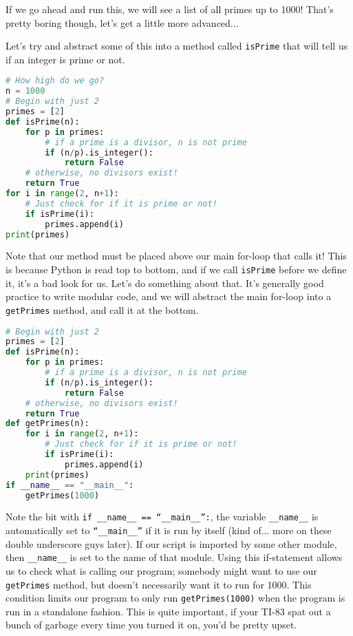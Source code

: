 \documentclass[12pt, twoside, reqno]{book}
\begin{document}
If we go ahead and run this, we will see a list of all primes up to 1000! That's pretty boring though, let's get a little more advanced...

Let's try and abstract some of this into a method called \texttt{isPrime} that will tell us if an integer is prime or not.
\begin{lstlisting}[language=Python]
# How high do we go?
n = 1000
# Begin with just 2
primes = [2]
def isPrime(n):
    for p in primes:
        # if a prime is a divisor, n is not prime
        if (n/p).is_integer():
            return False
    # otherwise, no divisors exist!
    return True
for i in range(2, n+1):
    # Just check for if it is prime or not!
    if isPrime(i):
        primes.append(i)
print(primes)
\end{lstlisting}

Note that our method must be placed above our main for-loop that calls it! This is because Python is read top to bottom, and if we call \texttt{isPrime} before we define it, it's a bad look for us. Let's do something about that. It's generally good practice to write modular code, and we will abstract the main for-loop into a \texttt{getPrimes} method, and call it at the bottom.
\begin{lstlisting}[language=Python]
# Begin with just 2
primes = [2]
def isPrime(n):
    for p in primes:
        # if a prime is a divisor, n is not prime
        if (n/p).is_integer():
            return False
    # otherwise, no divisors exist!
    return True
def getPrimes(n):
    for i in range(2, n+1):
        # Just check for if it is prime or not!
        if isPrime(i):
            primes.append(i)
    print(primes)
if __name__ == "__main__":
    getPrimes(1000)
\end{lstlisting}

Note the bit with \texttt{if \_\_name\_\_ == ``\_\_main\_\_'':}, the variable \texttt{\_\_name\_\_} is automatically set to \texttt{``\_\_main\_\_''} if it is run by itself (kind of... more on these double underscore guys later). If our script is imported by some other module, then \texttt{\_\_name\_\_} is set to the name of that module. Using this if-statement allows us to check what is calling our program; somebody might want to use our \texttt{getPrimes} method, but doesn't necessarily want it to run for 1000. This condition limits our program to only run \texttt{getPrimes(1000)} when the program is run in a standalone fashion. This is quite important, if your TI-83 spat out a bunch of garbage every time you turned it on, you'd be pretty upset.
\end{document}
